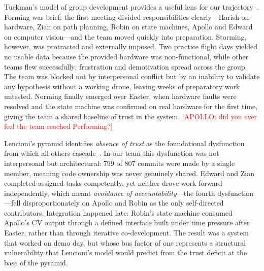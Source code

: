 

Tuckman's model of group development provides a useful lens for our trajectory~\cite{tuckman1965}.
Forming was brief: the first meeting divided responsibilities clearly---Harish on hardware,
Zian on path planning, Robin on state machines, Apollo and Edward on computer vision---and
the team moved quickly into preparation.
Storming, however, was protracted and externally imposed.
Two practice flight days yielded no usable data because the provided hardware was non-functional,
while other teams flew successfully; frustration and demotivation spread across the group.
The team was blocked not by interpersonal conflict but by an inability to validate any hypothesis
without a working drone, leaving weeks of preparatory work untested.
Norming finally emerged over Easter, when hardware faults were resolved and the state machine
was confirmed on real hardware for the first time, giving the team a shared baseline of trust
in the system.
\textcolor{red}{[APOLLO: did you ever feel the team reached Performing?]}


Lencioni's pyramid identifies \emph{absence of trust} as the foundational dysfunction from
which all others cascade~\cite{lencioni2002}.
In our team this dysfunction was not interpersonal but architectural: 799 of 807 commits
were made by a single member, meaning code ownership was never genuinely shared.
Edward and Zian completed assigned tasks competently, yet neither drove work forward
independently, which meant \emph{avoidance of accountability}---the fourth dysfunction---fell
disproportionately on Apollo and Robin as the only self-directed contributors.
Integration happened late: Robin's state machine consumed Apollo's CV output through a
defined interface built under time pressure after Easter, rather than through iterative
co-development.
The result was a system that worked on demo day, but whose bus factor of one represents
a structural vulnerability that Lencioni's model would predict from the trust deficit at
the base of the pyramid.

